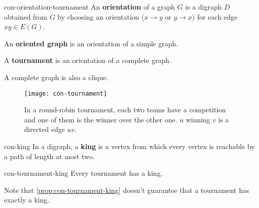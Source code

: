 \documentclass[../src/handouts/main.tex]{subfiles}
\begin{document}
\begin{definition}{}{con-orientation-tournament}
  An \textbf{orientation} of a graph $G$ is a digraph $D$ obtained from $G$ by choosing an orientation ($x \rightarrow y$ or $y \rightarrow x$) for each edge $xy \in E(G)$.

  An \textbf{oriented graph} is an orientation of a simple graph.

  A \textbf{tournament} is an orientation of a complete graph.
\end{definition}

A complete graph is also a clique.

\begin{figure}[htbp]
  \centering
  \texttt{[image: con-tournament]}
  \caption{In a round-robin tournament, each two teams have a competition and one of them is the winner over the other one. $u$ winning $v$ is a directed edge $uv$.}
  \label{fig:con-tournament}
\end{figure}

\begin{definition}{}{con-king}
  In a digraph, a \textbf{king} is a vertex from which every vertex is reachable by a path of length at most two.
\end{definition}

\begin{proposition}{}{con-tournament-king}
  Every tournament has a king.
\end{proposition}

Note that \cref{prop:con-tournament-king} doesn't guarantee that a tournament has exactly a king.
\end{document}
